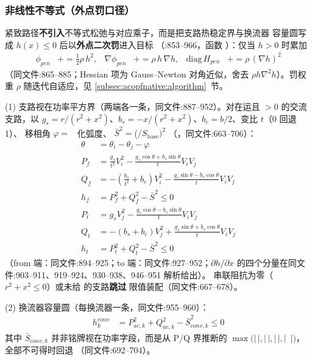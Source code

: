 \subsubsection*{非线性不等式（外点罚口径）}
紧致路径\textbf{不引入}不等式松弛与对应乘子，而是把支路热稳定界与换流器
容量圆写成 $h(x)\le 0$ 后以\textbf{外点二次罚}进入目标
（:853--966，函数
）：仅当 $h>0$ 时累加
\begin{align*}
\phi_{pen} &\mathrel{+}= \tfrac{1}{2}\rho\,h^{2}, &
\nabla\phi_{pen} &\mathrel{+}= \rho\,h\,\nabla h, &
\mathrm{diag}\,H_{pen} &\mathrel{+}= \rho\,(\nabla h)^{2}
\end{align*}
（同文件:865--885；Hessian 项为 Gauss--Newton 对角近似，舍去
$\rho h\nabla^{2}h$）。罚权重 $\rho$ 随迭代自适应，见
\ref{subsec:acopfnative:algorithm}~节。

(1) 支路视在功率平方界（两端各一条，同文件:887--952）。对在运且
$>0$ 的交流支路，以
$g_s=r/(r^{2}+x^{2})$、$b_s=-x/(r^{2}+x^{2})$、$b_c=b/2$、变比 $t$（0 回退 1）、
移相角 $\varphi=$~ 化弧度、
$\bar S^{2}=$($/S_{\mathrm{base}})^{2}$
（，同文件:663--706）：
\begin{align*}
\theta &= \theta_i-\theta_j-\varphi\\
P_f &= \frac{g_s}{t^{2}}V_i^{2} - \frac{g_s\cos\theta+b_s\sin\theta}{t}V_iV_j\\
Q_f &= -\left(\frac{b_s}{t^{2}}+b_c\right)V_i^{2}
       - \frac{g_s\sin\theta-b_s\cos\theta}{t}V_iV_j\\
h_f &= P_f^{2}+Q_f^{2}-\bar S^{2}\le 0\\
P_t &= g_sV_j^{2} - \frac{g_s\cos\theta-b_s\sin\theta}{t}V_iV_j\\
Q_t &= -(b_s+b_c)V_j^{2} + \frac{g_s\sin\theta+b_s\cos\theta}{t}V_iV_j\\
h_t &= P_t^{2}+Q_t^{2}-\bar S^{2}\le 0
\end{align*}
（from 端：同文件:894--925；to 端：同文件:927--952；$\partial h/\partial x$
的四个分量在同文件:903--911、919--924、930--938、946--951 解析给出）。
串联阻抗为零（$r^{2}+x^{2}\le 0$）或未给  的支路\textbf{跳过}
限值装配（同文件:667--678）。

(2) 换流器容量圆（每换流器一条，同文件:955--960）：
\begin{align*}
h^{conv}_k &= P_{ac,k}^{2}+Q_{ac,k}^{2}-\bar S^{2}_{conv,k}\le 0
\end{align*}
其中 $\bar S_{conv,k}$ 并非铭牌视在功率字段，而是从 P/Q 界推断的
$\max(|\,$$|,|\,$$|,|\,$$|,|\,$
$|)$，全部不可得时回退 
（同文件:692--704）。

